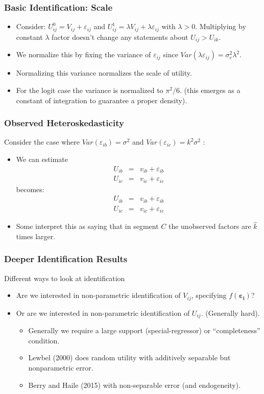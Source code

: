 \documentclass[aspectratio=169,11pt]{beamer}
\begin{document}
\begin{frame}
\frametitle{Basic Identification: Scale}
\begin{itemize}
\item Consider: $U_{ij}^0 = V_{ij} + \varepsilon_{ij}$ and  $U_{ij}^1 = \lambda V_{ij} + \lambda \varepsilon_{ij}$ with $\lambda > 0$. Multiplying by constant $\lambda$ factor doesn't change any statements about $U_{ij} > U_{ik}$.
\item We normalize this by fixing the variance of $\varepsilon_{ij}$ since $Var(\lambda \varepsilon_{ij} ) = \sigma_e^2 \lambda^2$.
\item Normalizing this variance normalizes the scale of utility.
\item For the logit case the variance is normalized to $\pi^2/6$. (this emerges as a constant of integration to guarantee a proper density).
\end{itemize}
\end{frame}



\begin{frame}
\frametitle{Observed Heteroskedasticity}
Consider the case where $Var(\varepsilon_{ib}) = \sigma^2$ and   $Var(\varepsilon_{ic}) =  k^2 \sigma^2$ :
\begin{itemize}
\item We can estimate
\begin{eqnarray*}
U_{ib} &=& v_{ib}+ \varepsilon_{ib}\\
U_{ic} &=& v_{ic}+ \varepsilon_{ic}
\end{eqnarray*}
becomes:
\begin{eqnarray*}
U_{ib} &=& v_{ib}+ \varepsilon_{ib}\\
U_{ic} &=& v_{ic}+ \varepsilon_{ic}
\end{eqnarray*}
\item Some interpret this as saying that in segment $C$ the unobserved factors are $\hat{k}$ times larger.
\end{itemize}
\end{frame}

\begin{frame}
\frametitle{Deeper Identification Results}
Different ways to look at identification
\begin{itemize}
\item Are we interested in non-parametric identification of $V_{ij}$, specifying $f(\boldsymbol{\varepsilon_i})$?
\item Or are we interested in non-parametric identification of $U_{ij}$. (Generally hard).
\begin{itemize}
\item Generally we require a large support (special-regressor) or ``completeness'' condition.
\item Lewbel (2000) does random utility with additively separable but nonparametric error.\item Berry and Haile (2015) with non-separable error (and endogeneity).
\end{itemize}
\end{itemize}
\end{frame}
\end{document}
